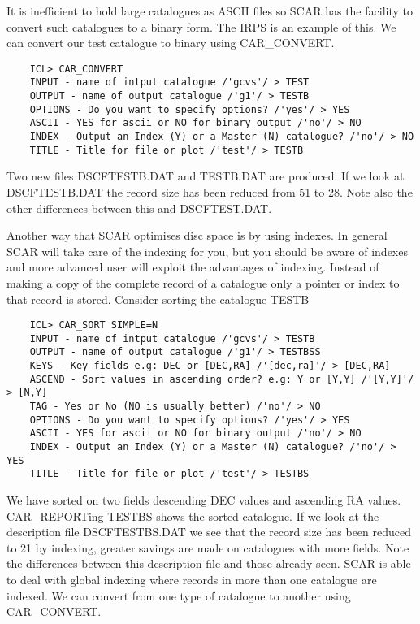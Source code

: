 It is inefficient to hold large catalogues as ASCII files so SCAR has the
facility to convert such catalogues to a binary form. The IRPS is an example
of this. We can convert our test catalogue to binary using CAR\_CONVERT.


\begin{verbatim}
    ICL> CAR_CONVERT
    INPUT - name of intput catalogue /'gcvs'/ > TEST
    OUTPUT - name of output catalogue /'g1'/ > TESTB
    OPTIONS - Do you want to specify options? /'yes'/ > YES
    ASCII - YES for ascii or NO for binary output /'no'/ > NO
    INDEX - Output an Index (Y) or a Master (N) catalogue? /'no'/ > NO
    TITLE - Title for file or plot /'test'/ > TESTB

\end{verbatim}

Two new files DSCFTESTB.DAT and TESTB.DAT are produced. If we look at
DSCFTESTB.DAT the record size has been reduced from 51 to 28. Note also the
other differences between this and DSCFTEST.DAT.

Another way that SCAR optimises disc space is by using indexes. In general
SCAR will take care of the indexing for you, but you should be aware of indexes
and more advanced user will exploit the advantages of indexing.
Instead of making a copy of the complete record
of a catalogue only a pointer or index to that record is stored. Consider
sorting the catalogue TESTB


\begin{verbatim}
    ICL> CAR_SORT SIMPLE=N
    INPUT - name of intput catalogue /'gcvs'/ > TESTB
    OUTPUT - name of output catalogue /'g1'/ > TESTBSS
    KEYS - Key fields e.g: DEC or [DEC,RA] /'[dec,ra]'/ > [DEC,RA]
    ASCEND - Sort values in ascending order? e.g: Y or [Y,Y] /'[Y,Y]'/ > [N,Y]
    TAG - Yes or No (NO is usually better) /'no'/ > NO
    OPTIONS - Do you want to specify options? /'yes'/ > YES
    ASCII - YES for ascii or NO for binary output /'no'/ > NO
    INDEX - Output an Index (Y) or a Master (N) catalogue? /'no'/ > YES
    TITLE - Title for file or plot /'test'/ > TESTBS

\end{verbatim}

We have sorted on two fields descending DEC values and ascending RA values.
CAR\_REPORTing TESTBS shows the sorted catalogue. If we look at the description
file DSCFTESTBS.DAT we see that the record size has been reduced to 21 by
indexing, greater
savings are made on catalogues with more fields. Note the differences between
this description file and those already seen. SCAR is able to deal with global
indexing where records in more than one catalogue are indexed.
We can convert from one type of catalogue
to another using CAR\_CONVERT.


